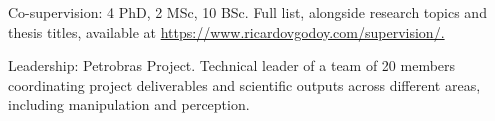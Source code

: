 \vspace{8pt} 
\begin{cvitems}
  \item {Co-supervision: 4 PhD, 2 MSc, 10 BSc. Full list, alongside research topics and thesis titles, available at \url{https://www.ricardovgodoy.com/supervision/.}} 
  \item {Leadership: Petrobras Project. Technical leader of a team of 20 members coordinating project deliverables and scientific outputs across different areas, including manipulation and perception.}
\end{cvitems}
\vspace{5pt} 
